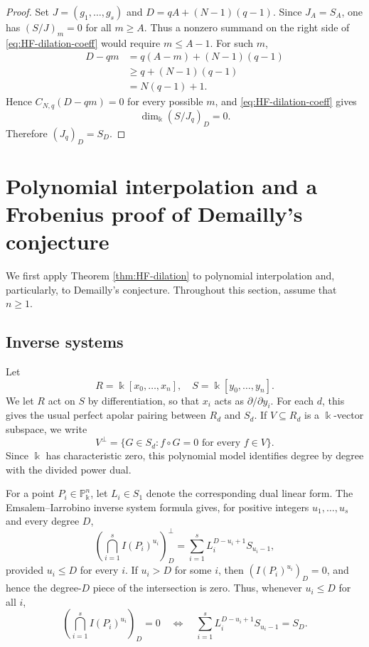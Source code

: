 \documentclass[11pt]{amsart}
\theoremstyle{remark}
\newcommand{\PP}{\mathbb P}
\newcommand{\kk}{\Bbbk}
\begin{document}
\begin{proof}
Set $J=(g_1,\ldots,g_s)$ and
$
D=qA+(N-1)(q-1).
$
Since $J_A=S_A$, one has $(S/J)_m=0$ for all $m\ge A$. Thus a nonzero summand on the right side of \eqref{eq:HF-dilation-coeff} would require $m\le A-1$. For such $m$,
$$
\begin{aligned}
D-qm
&=q(A-m)+(N-1)(q-1)\\
&\ge q+(N-1)(q-1)\\
&=N(q-1)+1.
\end{aligned}
$$
Hence $C_{N,q}(D-qm)=0$ for every possible $m$, and \eqref{eq:HF-dilation-coeff} gives
$$
\dim_{\kk}(S/J_q)_D=0.
$$
Therefore $(J_q)_D=S_D$.
\end{proof}

\section{Polynomial interpolation and a Frobenius proof of Demailly's conjecture}\label{sec:fatpoints}

We first apply Theorem \ref{thm:HF-dilation} to polynomial interpolation and, particularly, to Demailly's conjecture. 
Throughout this section, assume that $n\ge1$.

\subsection{Inverse systems}

Let
$$
R=\kk[x_0,\ldots,x_n],
\quad
S=\kk[y_0,\ldots,y_n].
$$
We let $R$ act on $S$ by differentiation, so that $x_i$ acts as $\partial/\partial y_i$. For each $d$, this gives the usual perfect apolar pairing between $R_d$ and $S_d$. If $V\subseteq R_d$ is a $\kk$-vector subspace, we write
$$
V^\perp=\{G\in S_d:f\circ G=0\text{ for every }f\in V\}.
$$
Since $\kk$ has characteristic zero, this polynomial model identifies degree by degree with the divided power dual.

For a point $P_i\in\PP_\kk^n$, let $L_i\in S_1$ denote the corresponding dual linear form. The Emsalem--Iarrobino inverse system formula \cite[Theorem~I]{EI} gives, for positive integers $u_1,\ldots,u_s$ and every degree $D$,
\begin{equation}\label{eq:EI}
\left(\bigcap_{i=1}^s I(P_i)^{u_i}\right)_D^\perp
=
\sum_{i=1}^s L_i^{D-u_i+1}S_{u_i-1},
\end{equation}
provided $u_i\le D$ for every $i$. If $u_i>D$ for some $i$, then $(I(P_i)^{u_i})_D=0$, and hence the degree-$D$ piece of the intersection is zero. Thus, whenever $u_i\le D$ for all $i$,
\begin{equation}\label{eq:apolar-vanishing}
\left(\bigcap_{i=1}^s I(P_i)^{u_i}\right)_D=0
\quad\Longleftrightarrow\quad
\sum_{i=1}^s L_i^{D-u_i+1}S_{u_i-1}=S_D.
\end{equation}
\end{document}
